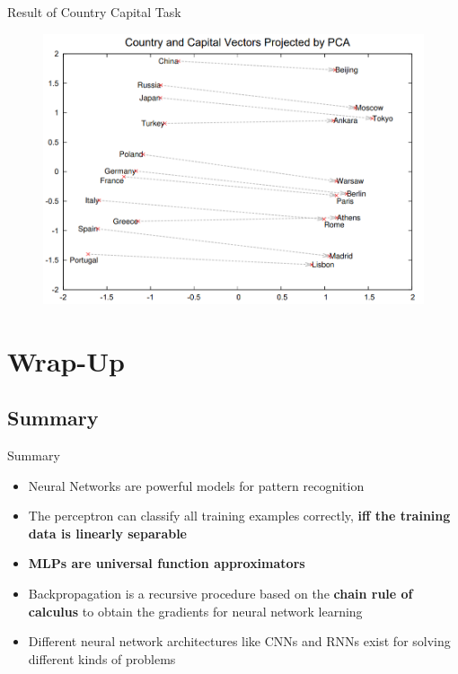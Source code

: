 \begin{frame}{Result of Country Capital Task}{}
	\begin{figure}
		\includegraphics[scale=0.3]{10_deep_learning/02_img/country_capital}
	\end{figure}
\end{frame}


\section{Wrap-Up}

\subsection{Summary}

\begin{frame}{Summary}{}
	\begin{itemize}
		\item Neural Networks are powerful models for pattern recognition
		\item The perceptron can classify all training examples correctly, \textbf{iff the training data is linearly separable}
		\item \textbf{MLPs are universal function approximators}
		\item Backpropagation is a recursive procedure based on the \textbf{chain rule of calculus} to obtain the gradients for neural network learning
		\item Different neural network architectures like CNNs and RNNs exist for solving different kinds of problems
	\end{itemize}
\end{frame}


